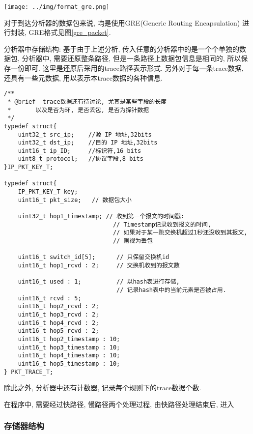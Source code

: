 {\begin{mdframed}[everyline=true]
\begin{center}
\texttt{[image: ../img/format\_gre.png]}
\label{gre_packet}
\end{center}

对于到达分析器的数据包来说, 均是使用GRE(Generic Routing Encapsulation)
进行封装, GRE格式见图\ref{gre_packet}.

分析器中存储结构: 基于由于上述分析,
传入任意的分析器中的是一个个单独的数据包, 分析器中, 需要还原整条路径,
但是一条路径上数据包信息是相同的, 所以保存一份即可.
这里是还原后采用的trace路径表示形式.
另外对于每一条trace数据, 还具有一些元数据, 用以表示本trace数据的各种信息.


\begin{lstlisting}
/**
 * @brief  trace数据还有待讨论, 尤其是某些字段的长度
 *       以及是否为环, 是否丢包, 是否为探针数据
 */
typedef struct{
    uint32_t src_ip;    //源 IP 地址,32bits
    uint32_t dst_ip;    //目的 IP 地址,32bits
    uint16_t ip_ID;     //标识符,16 bits
    uint8_t protocol;   //协议字段,8 bits
}IP_PKT_KEY_T;

typedef struct{
    IP_PKT_KEY_T key;
    uint16_t pkt_size;   // 数据包大小

    uint32_t hop1_timestamp; // 收到第一个报文的时间戳:
                               // Timestamp记录收到报文的时间,
                               // 如果对于某一跳交换机超过1秒还没收到其报文,
                               // 则视为丢包

    uint16_t switch_id[5];      // 只保留交换机id
    uint16_t hop1_rcvd : 2;     // 交换机收到的报文数

    uint16_t used : 1;          // 以hash表进行存储,
                                // 记录hash表中的当前元素是否被占用.
    uint16_t rcvd : 5;
    uint16_t hop2_rcvd : 2;
    uint16_t hop3_rcvd : 2;
    uint16_t hop4_rcvd : 2;
    uint16_t hop5_rcvd : 2;
    uint16_t hop2_timestamp : 10;
    uint16_t hop3_timestamp : 10;
    uint16_t hop4_timestamp : 10;
    uint16_t hop5_timestamp : 10;
} PKT_TRACE_T;
\end{lstlisting}

除此之外, 分析器中还有计数器, 记录每个规则下的trace数据个数.

在程序中, 需要经过快路径, 慢路径两个处理过程, 由快路径处理结束后, 进入


\subsubsection{存储器结构}


\end{mdframed}}

